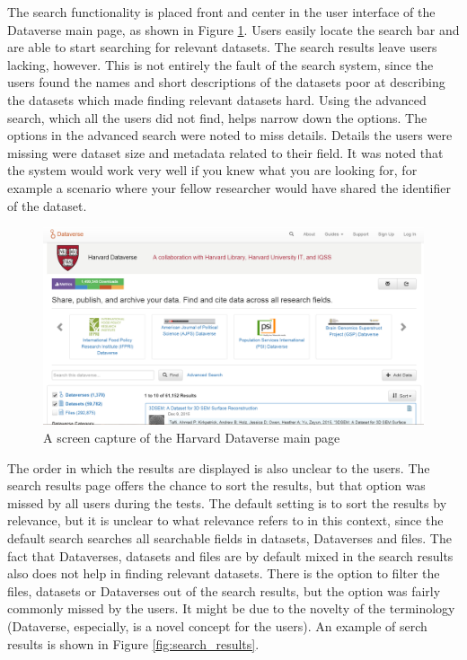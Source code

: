 The search functionality is placed front and center in the user interface of
the Dataverse main page, as shown in Figure \ref{fig:search_main_page}. Users
easily locate the search bar and are able to start searching for relevant
datasets. The search results leave users lacking, however. This is not entirely
the fault of the search system, since the users found the names and short
descriptions of the datasets poor at describing the datasets which made
finding relevant datasets hard. Using the advanced search, which all the users
did not find, helps narrow down the options. The options in the
advanced search were noted to miss details. Details the users were missing
were dataset size and metadata related to their field. It was noted that
the system would work very well if you knew what you are looking for, for example
a scenario where your fellow researcher would have shared the identifier of
the dataset.

\begin{figure}
    \begin{centering}
        \includegraphics[width=\textwidth]{images/search_main_page}
    \end{centering}
    \caption{A screen capture of the Harvard Dataverse main page}
    \label{fig:search_main_page}
\end{figure}

The order in which the results are displayed is also unclear to the users.
The search results page offers the chance to sort the results, but that option
was missed by all users during the tests. The default setting is to sort the results by
relevance, but it is unclear to what relevance refers to in this context, since
the default search searches all searchable fields in datasets, Dataverses and files.
The fact that Dataverses, datasets and files are by default mixed in the search
results also does not help in finding relevant datasets. There is the option to
filter the files, datasets or Dataverses out of the search results, but the
option was fairly commonly missed by the users. It might be due to the novelty
of the terminology (Dataverse, especially, is a novel concept for the users).
An example of serch results is shown in  Figure \ref{fig:search_results}.

